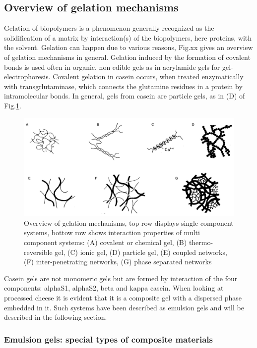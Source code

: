 \documentclass[
]{article}
\begin{document}
\subsection{Overview of gelation mechanisms}

Gelation of biopolymers is a phenomenon generally recognized as the
solidification of a matrix by interaction(s) of the biopolymers, here
proteins, with the solvent. Gelation can happen due to various reasons,
Fig.xx gives an overview of gelation mechanisms in general. Gelation
induced by the formation of covalent bonds is used often in organic, non
edible gels as in acrylamide gels for gel-electrophoresis. Covalent
gelation in casein occurs, when treated enzymatically with
transgrlutaminase, which connects the glutamine residues in a protein by
intramolecular bonds. In general, gels from casein are particle gels, as
in (D) of Fig.\ref{fig:gels}.

\begin{figure}
\includegraphics[width=0.8\linewidth]{images/gelation_intro} \caption[Types of gelation in biopolymers]{Overview of gelation mechanisms, top row displays single component systems, bottow row shows interaction properties of multi component systems: (A) covalent or chemical gel, (B) thermo-reversible gel, (C) ionic gel, (D) particle gel, (E) coupled networks, (F) inter-penetrating networks, (G) phase separated networks}\label{fig:gels}
\end{figure}

Casein gels are not monomeric gels but are formed by interaction of the
four components: alphaS1, alphaS2, beta and kappa casein. When looking
at processed cheese it is evident that it is a composite gel with a
dispersed phase embedded in it. Such systems have been described as
emulsion gels and will be described in the following section.

\subsubsection{Emulsion gels: special types of composite materials}
\end{document}
